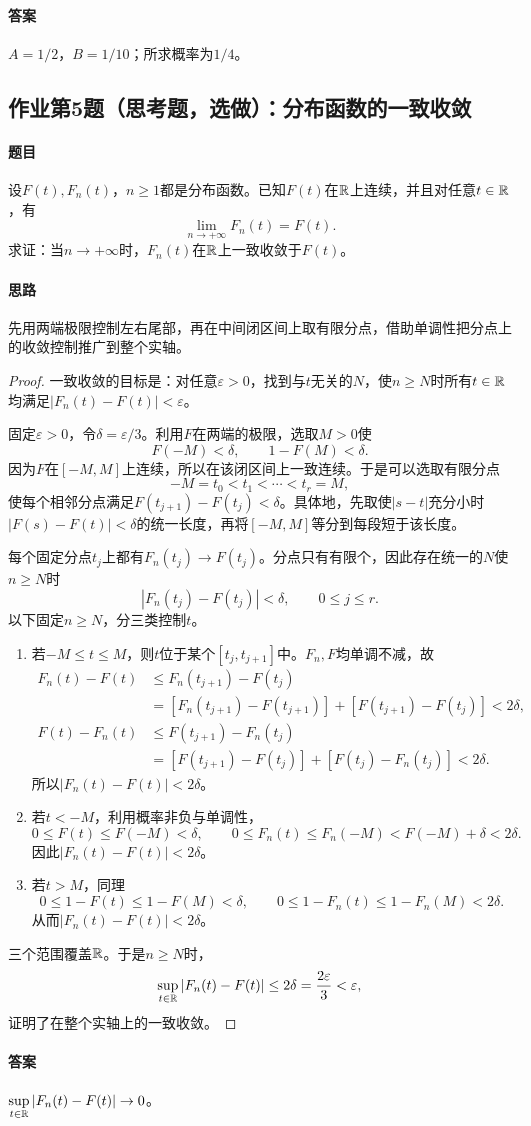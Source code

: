 \paragraph{答案}$A=1/2$，$B=1/10$；所求概率为$1/4$。

\subsection{作业第5题（思考题，选做）：分布函数的一致收敛}
\label{ex:w06-h5}
\paragraph{题目}
设$F(t),F_n(t)$，$n\geq1$都是分布函数。已知$F(t)$在$\mathbb R$上连续，并且对任意$t\in\mathbb R$，有
\[
\lim_{n\to+\infty}F_n(t)=F(t).
\]
求证：当$n\to+\infty$时，$F_n(t)$在$\mathbb R$上一致收敛于$F(t)$。
\paragraph{思路}先用两端极限控制左右尾部，再在中间闭区间上取有限分点，借助单调性把分点上的收敛控制推广到整个实轴。
\begin{proof}
一致收敛的目标是：对任意$\varepsilon>0$，找到与$t$无关的$N$，使$n\geq N$时所有$t\in\mathbb R$均满足$|F_n(t)-F(t)|<\varepsilon$。

固定$\varepsilon>0$，令$\delta=\varepsilon/3$。利用$F$在两端的极限，选取$M>0$使
\[
F(-M)<\delta,\qquad 1-F(M)<\delta.
\]
因为$F$在$[-M,M]$上连续，所以在该闭区间上一致连续。于是可以选取有限分点
\[
-M=t_0<t_1<\cdots<t_r=M,
\]
使每个相邻分点满足$F(t_{j+1})-F(t_j)<\delta$。具体地，先取使$|s-t|$充分小时$|F(s)-F(t)|<\delta$的统一长度，再将$[-M,M]$等分到每段短于该长度。

每个固定分点$t_j$上都有$F_n(t_j)\to F(t_j)$。分点只有有限个，因此存在统一的$N$使$n\geq N$时
\[
|F_n(t_j)-F(t_j)|<\delta,\qquad 0\leq j\leq r.
\]
以下固定$n\geq N$，分三类控制$t$。
\begin{enumerate}
\item 若$-M\leq t\leq M$，则$t$位于某个$[t_j,t_{j+1}]$中。$F_n,F$均单调不减，故
\begin{align*}
F_n(t)-F(t)
&\leq F_n(t_{j+1})-F(t_j)\\
&=[F_n(t_{j+1})-F(t_{j+1})]+[F(t_{j+1})-F(t_j)]<2\delta,\\
F(t)-F_n(t)
&\leq F(t_{j+1})-F_n(t_j)\\
&=[F(t_{j+1})-F(t_j)]+[F(t_j)-F_n(t_j)]<2\delta.
\end{align*}
所以$|F_n(t)-F(t)|<2\delta$。
\item 若$t<-M$，利用概率非负与单调性，
\[
0\leq F(t)\leq F(-M)<\delta,
\qquad 0\leq F_n(t)\leq F_n(-M)<F(-M)+\delta<2\delta.
\]
因此$|F_n(t)-F(t)|<2\delta$。
\item 若$t>M$，同理
\[
0\leq1-F(t)\leq1-F(M)<\delta,
\qquad0\leq1-F_n(t)\leq1-F_n(M)<2\delta.
\]
从而$|F_n(t)-F(t)|<2\delta$。
\end{enumerate}
三个范围覆盖$\mathbb R$。于是$n\geq N$时，
\[
\sup_{t\in\mathbb R}|F_n(t)-F(t)|\leq2\delta=\frac{2\varepsilon}{3}<\varepsilon,
\]
证明了在整个实轴上的一致收敛。
\end{proof}
\paragraph{答案}$\displaystyle\sup_{t\in\mathbb R}|F_n(t)-F(t)|\to0$。
